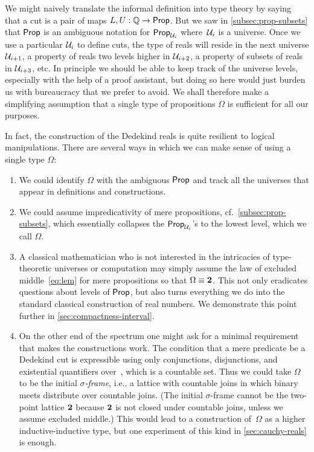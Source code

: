 %
We might naively translate the informal definition into type theory by saying that a cut
is a pair of maps $L, U : \mathbb{Q} \to \mathsf{Prop}$. But we saw in \autoref{subsec:prop-subsets} that
$\mathsf{Prop}$ is an ambiguous notation for $\mathsf{Prop}_{\mathcal{U}_i}$ where~$\mathcal{U}_i$ is a universe. Once we
use a particular $\mathcal{U}_i$ to define cuts, the type of reals will reside in the next
universe $\mathcal{U}_{i+1}$, a property of reals two levels higher in $\mathcal{U}_{i+2}$, a property of
subsets of reals in $\mathcal{U}_{i+3}$, etc. In principle we should be able to keep track of the
universe levels, especially with the help of a proof assistant, but doing so here would
just burden us with bureaucracy that we prefer to avoid. We shall therefore make a
simplifying assumption that a single type of propositions $\Omega$ is sufficient for all
our purposes.

In fact, the construction of the Dedekind reals is quite resilient to logical
manipulations. There are several ways in which we can make sense of using a single type
$\Omega$:
%
\begin{enumerate}

\item We could identify $\Omega$ with the ambiguous $\mathsf{Prop}$ and track all the universes
  that appear in definitions and constructions.

\item We could assume impredicativity of mere propositions, cf.\
  \autoref{subsec:prop-subsets}, which essentially collapses the $\mathsf{Prop}_{\mathcal{U}_i}$'s to the
  lowest level, which we call $\Omega$.

\item A classical mathematician who is not interested in the intricacies of type-theoretic
  universes or computation may simply assume the law of excluded middle~\eqref{eq:lem} for
  mere propositions so that $\Omega \equiv \mathbf{2}$. This not only eradicates questions about
  levels of $\mathsf{Prop}$, but also turns everything we do into the standard classical
  construction of real numbers. We demonstrate this point further in
  \autoref{sec:compactness-interval}.

\item On the other end of the spectrum one might ask for a minimal requirement that makes
  the constructions work. The condition that a mere predicate be a Dedekind cut is
  expressible using only conjunctions, disjunctions, and existential quantifiers over~\Q, which
  is a countable set. Thus we could take $\Omega$ to be the initial \emph{$\sigma$-frame},
  i.e., a lattice with countable joins in which binary meets distribute over countable
  joins. (The initial $\sigma$-frame cannot be the two-point lattice $\mathbf{2}$ because
  $\mathbf{2}$ is not closed under countable joins, unless we assume excluded middle.) This
  would lead to a construction of~$\Omega$ as a higher inductive-inductive type, but one
  experiment of this kind in \autoref{sec:cauchy-reals} is enough.
\end{enumerate}

